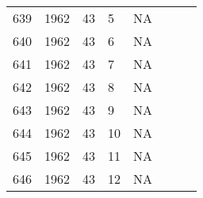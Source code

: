\begin{longtable}{ |l|l|l|l|l|l|l|l| }
639 & 1962 & 43 &     5 &      NA &                &  & \\
640 & 1962 & 43 &     6 &      NA &                &  & \\
641 & 1962 & 43 &     7 &      NA &                &   & \\
642 & 1962 & 43 &     8 &      NA &                &  & \\
643 & 1962 & 43 &     9 &      NA &                &  & \\
644 & 1962 & 43 &    10 &      NA &                &  & \\
645 & 1962 & 43 &    11 &      NA &                &  & \\
646 & 1962 & 43 &    12 &      NA &                &  & \\
\end{longtable}

